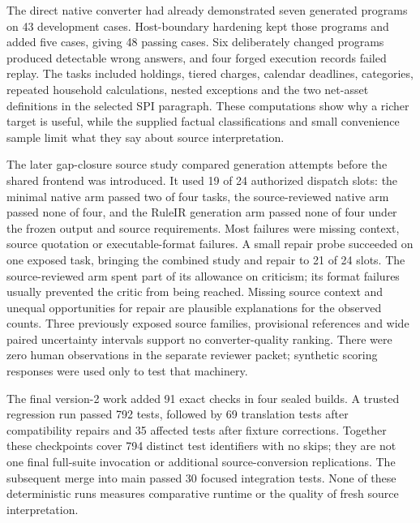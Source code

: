 The direct native converter had already demonstrated seven generated programs
on 43 development cases. Host-boundary hardening kept those programs and added
five cases, giving 48 passing cases. Six deliberately changed programs produced
detectable wrong answers, and four forged execution records failed replay.
The tasks included holdings, tiered charges, calendar deadlines, categories,
repeated household calculations, nested exceptions and the two net-asset
definitions in the selected SPI paragraph. These computations show why a
richer target is useful, while the supplied factual classifications and small
convenience sample limit what they say about source interpretation.

The later gap-closure source study compared generation attempts before the
shared frontend was introduced. It used 19 of 24 authorized dispatch slots:
the minimal native arm passed two of four tasks, the source-reviewed native arm
passed none of four, and the RuleIR generation arm passed none of four under
the frozen output and source requirements. Most failures were missing context,
source quotation or executable-format failures. A small repair probe succeeded
on one exposed task, bringing the combined study and repair to 21 of 24 slots.
The source-reviewed arm spent part of its allowance on criticism; its format
failures usually prevented the critic from being reached. Missing source
context and unequal opportunities for repair are plausible explanations for
the observed counts. Three previously exposed source families, provisional
references and wide paired uncertainty intervals support no converter-quality
ranking. There were zero human observations in the separate reviewer packet;
synthetic scoring responses were used only to test that machinery.

The final version-2 work added 91 exact checks in four sealed builds. A trusted
regression run passed 792 tests, followed by 69 translation tests after
compatibility repairs and 35 affected tests after fixture corrections. Together
these checkpoints cover 794 distinct test identifiers with no skips; they are
not one final full-suite invocation or additional source-conversion
replications. The subsequent merge into main passed 30 focused integration
tests. None of these deterministic runs measures comparative runtime or the
quality of fresh source interpretation.

